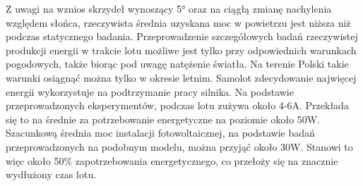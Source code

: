 \documentclass[12pt, a4paper]{article}
\begin{document}
Z uwagi na wznios skrzydeł wynoszący 5° oraz na ciągłą zmianę nachylenia względem słońca, rzeczywista średnia uzyskana moc w powietrzu jest niższa niż podczas statycznego badania. Przeprowadzenie szczegółowych badań rzeczywistej produkcji energii w trakcie lotu możliwe jest tylko przy odpowiednich warunkach pogodowych, także biorąc pod uwagę natężenie światła. Na terenie Polski takie warunki osiągnąć można tylko w okresie letnim. Samolot zdecydowanie najwięcej energii wykorzystuje na podtrzymanie pracy silnika. Na podstawie przeprowadzonych eksperymentów, podczas lotu zużywa około 4-6A. Przekłada się to na średnie za potrzebowanie energetyczne na poziomie około 50W. Szacunkową średnia moc instalacji fotowoltaicznej, na podstawie badań przeprowadzonych na podobnym modelu, można przyjąć około 30W. Stanowi to więc około 50\% zapotrzebowania energetycznego, co przełoży się na znacznie wydłużony czas lotu.

\FloatBarrier
\end{document}
